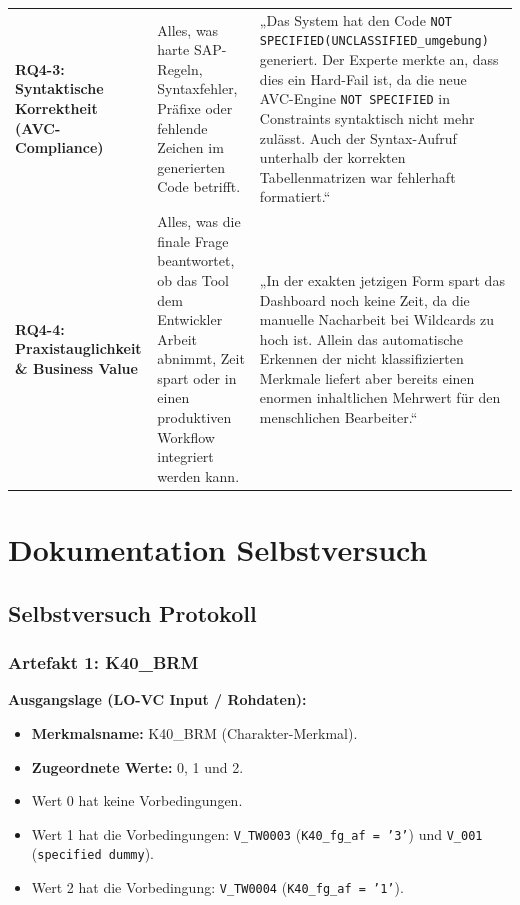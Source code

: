 \documentclass[12pt, a4paper, oneside]{book}
\begin{document}
\begin{xltabular}{\textwidth}{@{} 
    >{\raggedright\arraybackslash}p{4cm} 
    >{\raggedright\arraybackslash}p{4.5cm} 
    >{\raggedright\arraybackslash}X @{}}
    \textbf{RQ4-3: Syntaktische Korrektheit \newline (AVC-Compliance)} & 
    Alles, was harte SAP-Regeln, Syntaxfehler, Präfixe oder fehlende Zeichen im generierten Code betrifft. & 
    „Das System hat den Code \texttt{NOT SPECIFIED(UNCLASSIFIED\_umgebung)} generiert. Der Experte merkte an, dass dies ein Hard-Fail ist, da die neue AVC-Engine \texttt{NOT SPECIFIED} in Constraints syntaktisch nicht mehr zulässt. Auch der Syntax-Aufruf unterhalb der korrekten Tabellenmatrizen war fehlerhaft formatiert.“ \\
    \addlinespace
    
    \textbf{RQ4-4: Praxistauglichkeit \& Business Value} & 
    Alles, was die finale Frage beantwortet, ob das Tool dem Entwickler Arbeit abnimmt, Zeit spart oder in einen produktiven Workflow integriert werden kann. & 
    „In der exakten jetzigen Form spart das Dashboard noch keine Zeit, da die manuelle Nacharbeit bei Wildcards zu hoch ist. Allein das automatische Erkennen der nicht klassifizierten Merkmale liefert aber bereits einen enormen inhaltlichen Mehrwert für den menschlichen Bearbeiter.“ \\
    
\end{xltabular}
\chapter{Dokumentation Selbstversuch}
\label{subsec:selbstversuch_doku}
\section{Selbstversuch Protokoll}
\subsection*{Artefakt 1: K40\_BRM}

\textbf{Ausgangslage (LO-VC Input / Rohdaten):}
\begin{itemize}
    \item \textbf{Merkmalsname:} K40\_BRM (Charakter-Merkmal).
    \item \textbf{Zugeordnete Werte:} 0, 1 und 2.
    \item Wert 0 hat keine Vorbedingungen.
    \item Wert 1 hat die Vorbedingungen: \texttt{V\_TW0003} (\texttt{K40\_fg\_af = '3'}) und \texttt{V\_001} (\texttt{specified dummy}).
    \item Wert 2 hat die Vorbedingung: \texttt{V\_TW0004} (\texttt{K40\_fg\_af = '1'}).
\end{itemize}
\end{document}
